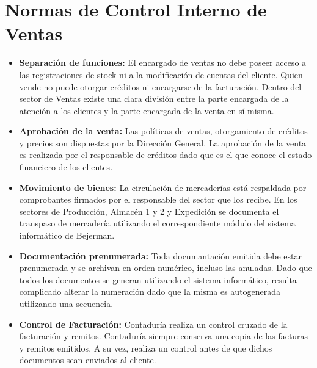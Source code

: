 \pagebreak
\section{Normas de Control Interno de Ventas}
\begin{itemize}
 \item	{\bf Separaci\'on de funciones: } El encargado de ventas no debe poseer acceso a las registraciones de stock ni a la modificaci\'on de cuentas del cliente.
Quien vende no puede otorgar cr\'editos ni encargarse de la facturaci\'on. Dentro del sector de Ventas existe una clara divisi\'on entre la parte encargada de la atenci\'on a los clientes 
y la parte encargada de la venta en s\'i misma.
  \item	{\bf Aprobaci\'on de la venta: } Las pol\'iticas de ventas, otorgamiento de cr\'editos y precios son dispuestas por la Direcci\'on General.
La aprobaci\'on de la venta es realizada por el responsable de cr\'editos dado que es el que conoce el estado financiero de los clientes.
  \item	{\bf Movimiento de bienes: } La circulaci\'on de mercader\'ias est\'a respaldada por comprobantes firmados por el responsable del sector que los recibe. En los sectores de Producci\'on, 
Almac\'en 1 y 2 y Expedici\'on se documenta el transpaso de mercader\'ia utilizando el correspondiente m\'odulo del sistema inform\'atico de Bejerman.
  \item	{\bf Documentaci\'on prenumerada: } Toda documantaci\'on emitida debe estar prenumerada y se archivan en orden num\'erico, incluso las anuladas. Dado que todos los documentos se generan 
utilizando el sistema inform\'atico, resulta complicado alterar la numeraci\'on dado que la misma es autogenerada utilizando una secuencia.
  \item	{\bf Control de Facturaci\'on: } Contadur\'ia realiza un control cruzado de la facturaci\'on y remitos. Contadur\'ia siempre conserva una copia de las facturas y remitos emitidos. 
A su vez, realiza un control antes de que dichos documentos sean enviados al cliente.
\end{itemize}
